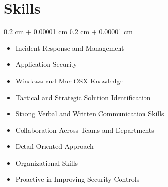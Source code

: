 \documentclass[10pt, letterpaper]{article}
\newenvironment{highlightsforbulletentries}{
    \begin{itemize}[
        topsep=0.10 cm,
        parsep=0.10 cm,
        partopsep=0pt,
        itemsep=0pt,
        leftmargin=10pt
    ]
}{
    \end{itemize}
} %
\newenvironment{onecolentry}{
    \begin{adjustwidth}{
        0.2 cm + 0.00001 cm
    }{
        0.2 cm + 0.00001 cm
    }
}{
    \end{adjustwidth}
} %
\begin{document}
    \section{Skills}

    \begin{onecolentry}
        \begin{highlightsforbulletentries}


        \item Incident Response and Management

        \item Application Security

        \item Windows and Mac OSX Knowledge

        \item Tactical and Strategic Solution Identification

        \item Strong Verbal and Written Communication Skills

        \item Collaboration Across Teams and Departments

        \item Detail-Oriented Approach

        \item Organizational Skills

        \item Proactive in Improving Security Controls


        \end{highlightsforbulletentries}
    \end{onecolentry}
\end{document}
